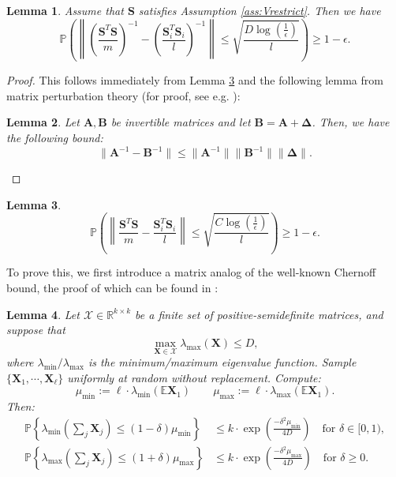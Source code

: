 \documentclass[twoside,11pt]{article}
\newcommand{\md}[1]{\mathbb{#1}}
\newtheorem{lem}{Lemma}
\begin{document}
\begin{lem}
	\label{lem:matrix_inv_ineq}
	Assume that $\bm{S}$ satisfies Assumption \ref{ass:Vrestrict}. Then we have 
	\begin{equation}
	\md{P}\left(\left\|\left(\frac{\bm{S}^T\bm{S}}{m}\right)^{-1}-\left(\frac{\bm{S}_i^T\bm{S}_i}{l}\right)^{-1}\right\|\leq \sqrt{\frac{D\log(\frac{1}{\epsilon})}{l}}\right)\geq 1- \epsilon. \label{eq:matrix_inv_ineq} 
	\end{equation}
\end{lem}
\begin{proof}
	This follows immediately from Lemma \ref{lem:matrix_ineq} and the following lemma from matrix perturbation theory (for proof, see e.g. \cite{stewart1990matrix}):
	\begin{lem}
		\label{lem:matrix_inv}
		Let $\bm{A},\bm{B}$ be invertible matrices and let $\bm{B}=\bm{A}+\bm{\Delta}$. Then, we have the following bound:
		\begin{equation}
		\|\bm{A}^{-1}-\bm{B}^{-1}\|\leq \|\bm{A}^{-1}\|\|\bm{B}^{-1}\|\|\bm{\Delta}\|.
		\end{equation}
	\end{lem}
\end{proof}
\begin{lem}
	\label{lem:matrix_ineq}
	\begin{equation}
	\md{P}\left(\left\|\frac{\bm{S}^T\bm{S}}{m}-\frac{\bm{S}_i^T\bm{S}_i}{l}\right\|\leq \sqrt{\frac{C\log(\frac{1}{\epsilon})}{l}}\right)\geq 1- \epsilon. \label{eq:matrix_dev_bound3} 
	\end{equation}
\end{lem}
To prove this, we 
first introduce a matrix analog of the well-known Chernoff bound, the proof of which can be found in \cite{tropp2012user}:
\begin{lem}
	\label{lem:matrix_chernoff}
	Let $\mathcal{X} \in \md{R}^{k \times k}$ be a finite set of positive-semidefinite matrices, and suppose that
	\[\max_{\bm{X} \in \mathcal{X}} \lambda_{\max}(\bm{X})\leq D,\]
	where $\lambda_{\min}/\lambda_{\max}$ is the minimum/maximum eigenvalue function. Sample $\{\bm{X}_1,\cdots, \bm{X}_\ell\}$ uniformly at random without replacement. Compute:
	\[\mu_{\min}:=\ell \cdot \lambda_{\min}(\md{E} \bm{X}_1)\qquad \mu_{\max}:=\ell \cdot \lambda_{\max}(\md{E} \bm{X}_1).\]
	Then:
	\begin{align*}
	\md{P}\left\{\lambda_{\min} \left(\sum_j \bm{X}_j\right)\leq (1-\delta) \mu_{\min} \right\}&\leq k \cdot \exp\left(\frac{-\delta^2\mu_{\min}}{4D}\right) \quad \text{for } \delta \in [0,1),\\
	\md{P}\left\{\lambda_{\max} \left(\sum_j \bm{X}_j\right)\leq (1+\delta) \mu_{\max} \right\}&\leq k \cdot \exp\left(\frac{-\delta^2\mu_{\max}}{4D}\right) \quad \text{for } \delta \geq 0.       
	\end{align*}
\end{lem}
\end{document}

